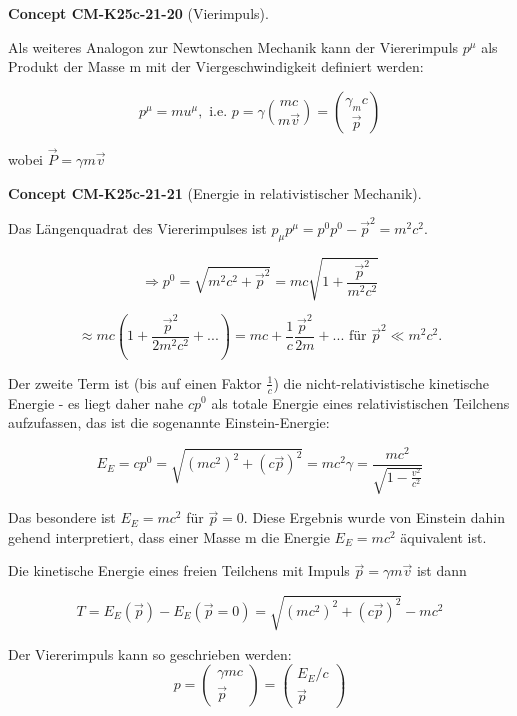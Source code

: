 \documentclass[10pt, letterpaper]{article}
\newcommand{\CustomHeading}[3]{%
  \par\medskip\noindent%
  \textbf{#1 #2} \textnormal{(#3)}.\enskip%
}
\newenvironment{CONC}[2]{\CustomHeading{Concept}{#1}{#2}}{}
\begin{document}
\begin{CONC}{CM-K25c-21-20}{Vierimpuls}
Als weiteres Analogon zur Newtonschen Mechanik kann der Viererimpuls $p^\mu$ als Produkt der Masse m mit der Viergeschwindigkeit definiert werden:

\[p^\mu = mu^\mu, \text{ i.e. } p=\gamma\binom{m c}{m \vec{v}}=\binom{\gamma_m c}{\vec{p}}\]

wobei $\vec{P} = \gamma m\vec{v}$
\end{CONC}

\begin{CONC}{CM-K25c-21-21}{Energie in relativistischer Mechanik}
Das Längenquadrat des Viererimpulses ist $p_\mu p^\mu = p^0p^0-\vec{p}^2 = m^2c^2$.

\[\Rightarrow p^0 = \sqrt{m^2c^2 + \vec{p}^2} = mc\sqrt{1+\frac{\vec{p}^2}{m^2c^2}}\]

\[\approx mc\left(1+\frac{\vec{p}^2}{2m^2c^2}+...\right) = mc + \frac{1}{c}\frac{\vec{p}^2}{2m}+... \text{ für } \vec{p}^2 \ll m^2c^2.\]

Der zweite Term ist (bis auf einen Faktor $\frac{1}{c}$) die nicht-relativistische kinetische Energie - es liegt daher nahe $cp^0$ als totale Energie eines relativistischen Teilchens aufzufassen,
das ist die sogenannte Einstein-Energie:

\[E_E = cp^0 = \sqrt{(mc^2)^2 + (c\vec{p})^2} = mc^2\gamma = \frac{mc^2}{\sqrt{1-\frac{v^2}{c^2}}}\]

Das besondere ist $E_E = mc^2$ für $\vec{p}=0$. Diese Ergebnis wurde von Einstein dahin gehend interpretiert, dass einer Masse m die Energie $E_E = mc^2$ äquivalent ist.

Die kinetische Energie eines freien Teilchens mit Impuls $\vec{p}=\gamma m\vec{v}$ ist dann

\[T = E_E(\vec{p}) - E_E(\vec{p}=0) = \sqrt{(mc^2)^2 + (c\vec{p})^2} - mc^2\]

Der Viererimpuls kann so geschrieben werden:
\[p = \begin{pmatrix} \gamma mc \\ \vec{p} \end{pmatrix} = \begin{pmatrix} E_E/c \\ \vec{p} \end{pmatrix}\]
\end{CONC}
\end{document}

